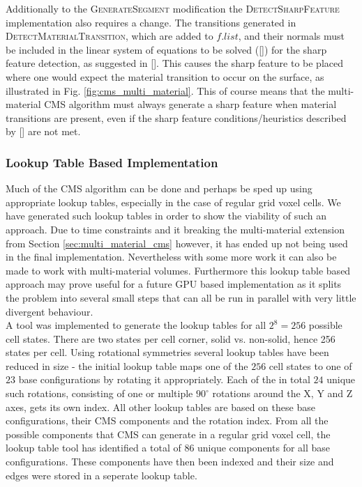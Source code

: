 Additionally to the \textsc{GenerateSegment} modification the \textsc{DetectSharpFeature} implementation also requires a change. The transitions generated in \textsc{DetectMaterialTransition}, which are added to
$f.list$, and their normals must be included in the linear system of equations to be solved ([]) for the sharp feature detection,
as suggested in []. This causes the sharp feature to be placed where one would expect the material transition to occur on the surface, as illustrated in Fig. \ref{fig:cms_multi_material}.
This of course means that the multi-material CMS algorithm must always generate a sharp feature when material transitions are present, even if the sharp feature conditions/heuristics described by [] are not met.

\subsubsection{Lookup Table Based Implementation}

Much of the CMS algorithm can be done and perhaps be sped up using appropriate lookup tables, especially in the case of regular grid voxel cells. We have generated such lookup tables in order to show
the viability of such an approach. Due to time constraints and it breaking the multi-material extension from Section \ref{sec:multi_material_cms} however, it has ended up not being used in the final implementation.
Nevertheless with some more work it can also be made to work with multi-material volumes. Furthermore this lookup table based approach may prove useful for a future GPU based implementation as it splits
the problem into several small steps that can all be run in parallel with very little divergent behaviour.\\
A tool was implemented to generate the lookup tables for all $2^8 = 256$ possible cell states. There are two states per cell corner, solid vs. non-solid, hence 256 states per cell. Using rotational symmetries several lookup tables have been reduced in size - the initial lookup table maps one of the $256$ cell states to one of $23$ base configurations by rotating it appropriately. Each of the in total $24$ unique such rotations, consisting of one or multiple $90^{\circ}$ rotations around the X, Y and Z axes, gets its own index.
All other lookup tables are based on these base configurations, their CMS components and the rotation index.
From all the possible components that CMS can generate in a regular grid voxel cell, the lookup table tool has identified a total of $86$ unique components for all base configurations. These components have
then been indexed and their size and edges were stored in a seperate lookup table.\\

